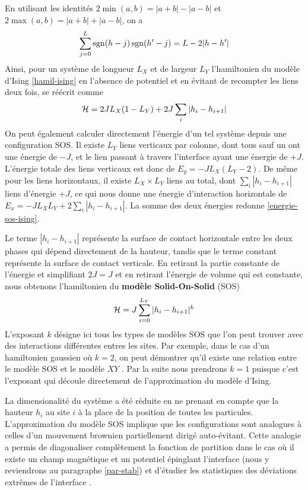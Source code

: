 En utilisant les identités $2 \min(a,b) = |a+b| - |a-b|$ et $ 2\max(a,b)= |a+b| + |a-b|$, on a
\begin{align*}
    \sum_{j=0}^L \operatorname{sgn}(h-j)\operatorname{sgn}(h'-j) = L - 2 |h-h'|
\end{align*}
Ainsi, pour un système de longueur $L_X$ et de largeur $L_Y$ l'hamiltonien du modèle d'Ising \ref{hamil-ising} en l'absence de potentiel et en évitant de recompter les liens deux fois, se réécrit comme 
\begin{align}
    \mathcal{H} = 2 J L_X (1-L_Y) +2 J \sum_i |h_i-h_{i+1}|
    \label{energie-sos-ising}
\end{align}
On peut également calculer directement l'énergie d'un tel système depuis une configuration SOS. Il existe $ L_Y$ liens verticaux par colonne, dont tous sauf un ont une énergie de $-J$, et le lien passant à travers l'interface ayant une énergie de $+J$. L'énergie totale des liens verticaux est donc de $E_y = - J L_X ( L_Y-2)$. De même pour les liens horizontaux, il existe $L_X \times L_Y$ liens au total, dont $\sum_i |h_i-h_{i+1}|$ liens d'énergie $+J$, ce qui nous donne une énergie d'interaction horizontale de $E_x = - J L_X L_Y + 2 \sum_i |h_i-h_{i+1}|$. La somme des deux énergies redonne \ref{energie-sos-ising}.

Le terme $|h_i-h_{i+1}|$ représente la surface de contact horizontale entre les deux phases qui dépend directement de la hauteur, tandis que le terme constant représente la surface de contact verticale.
En retirant la partie constante de l'énergie et simplifiant $2 J = J$ et en retirant l'énergie de volume qui est constante, nous obtenons l'hamiltonien du \textbf{modèle Solid-On-Solid} (SOS)
\begin{align}
    \mathcal{H} = J \sum_{i=0}^{L_Y} |h_i-h_{i+1}|^k
    \label{hamil-sos}
\end{align}
L'exposant $k$ désigne ici tous les types de modèles SOS que l'on peut trouver avec des interactions différentes entres les sites. Par exemple, dans le cas d'un hamiltonien gaussien où  $k=2$, on peut démontrer qu'il existe une relation entre le modèle SOS et le modèle $XY$ \cite{knops_exact_1977}. Par la suite nous prendrons $k=1$ puisque c'est l'exposant qui découle directement de l'approximation du modèle d'Ising.

La dimensionalité du système a été réduite en ne prenant en compte que la hauteur $h_i$ au site $i$ à la place de la position de toutes les particules. L'approximation du modèle SOS implique que les configurations sont analogues à celles d'un mouvement brownien partiellement dirigé auto-évitant. Cette analogie a permis de diagonaliser complètement la fonction de partition dans le cas où il existe un champ magnétique et un potentiel épinglant l'interface (nous y reviendrons au paragraphe \ref{par-stab}) \cite{owczarek_exact_1993} et d'étudier les statistiques des déviations extrêmes de l'interface \cite{majumdar_airy_2005,schehr_universal_2006}.

